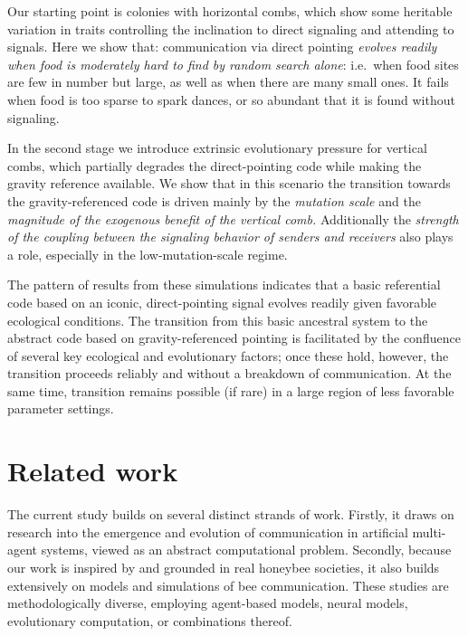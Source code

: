 \documentclass[11pt]{article}
\begin{document}
Our starting point is colonies with horizontal combs, which show some
heritable variation in traits controlling the inclination to direct
signaling and attending to signals. Here we show that:
communication via
direct pointing \emph{evolves readily when food is moderately hard to find by random
search alone}: i.e.\ when food sites are few in number but large, as well as when there 
are many small ones. It fails when food is too sparse to spark dances,
 or so abundant that it is found without signaling. 


In the second stage we introduce extrinsic evolutionary pressure for
vertical combs, which partially degrades the direct-pointing code while
making the gravity reference available. We show that in this scenario the
transition towards the gravity-referenced code is driven mainly by the \emph{
mutation scale} and the \emph{magnitude of the exogenous benefit of the vertical comb.}
Additionally the \emph{strength of the coupling between the signaling behavior
of senders and receivers} also plays a role, especially in the low-mutation-scale
regime.


The pattern of results from these simulations indicates that a basic referential
code based on an iconic, direct-pointing signal evolves readily given favorable
ecological conditions. The transition from this basic ancestral system to the
abstract code based on gravity-referenced pointing is facilitated by the
confluence of several key ecological and evolutionary factors; once these hold,
however, the transition proceeds reliably and without a breakdown of
communication. At the same time, transition remains possible (if rare) in a
large region of less favorable parameter settings. 

\section{Related work}
\label{sec:related}
The current study builds on several distinct strands of work. Firstly, it 
draws on research into the emergence and evolution of communication in 
artificial multi-agent systems, viewed as an abstract computational problem.
 Secondly, because our work is inspired by and grounded in real honeybee 
 societies, it also builds extensively on models and simulations of bee 
 communication. These studies are methodologically diverse, employing 
 agent-based models, neural models, evolutionary computation, or combinations
 thereof.
\end{document}
